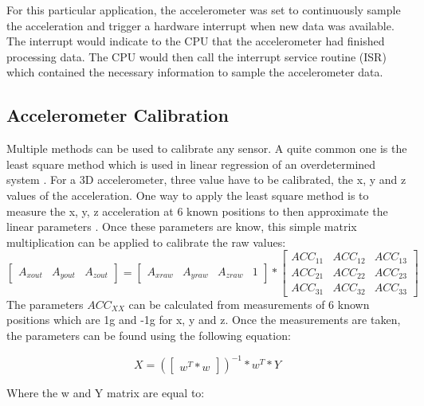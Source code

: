 ﻿\documentclass[12pt]{article}
\begin{document}
For this particular application, the accelerometer was set to continuously sample the acceleration and trigger a hardware interrupt when new data was available. The interrupt would indicate to the CPU that the accelerometer had finished processing data. The CPU would then call the interrupt service routine (ISR) which contained the necessary information to sample the accelerometer data.

\subsection{Accelerometer Calibration}

Multiple methods can be used to calibrate any sensor. A quite common one is the least square method which is used in linear regression of an overdetermined system \cite{bjorck1996numerical}. For a 3D accelerometer, three value have to be calibrated, the x, y and z values of the acceleration. One way to apply the least square method is to measure the x, y, z acceleration at 6 known positions to then approximate the linear parameters \cite{AN3182ApplicationNote}. Once these parameters are know, this simple matrix multiplication can be applied to calibrate the raw values:
\begin{equation} \label{cal_eq:1}
 \begin{bmatrix}A_{xout} & A_{yout} & A_{zout}\end{bmatrix} = \begin{bmatrix}A_{xraw} & A_{yraw} & A_{zraw} & 1\end{bmatrix} *
\begin{bmatrix}ACC_{11} & ACC_{12} & ACC_{13} \\
ACC_{21} & ACC_{22} & ACC_{23} \\
ACC_{31} & ACC_{32} & ACC_{33} \end{bmatrix}
\end{equation} 
The parameters $ ACC_{XX} $ can be calculated from measurements of 6 known positions which are 1g and -1g for x, y and z. Once the measurements are taken, the parameters can be found using the following equation:

\begin{equation} \label{cal_eq:2}
 X = (\begin{bmatrix} w^{T}*w \end{bmatrix})^{-1}*w^{T} * Y 
 \end{equation}

Where the w and Y matrix are equal to: 
\end{document}
